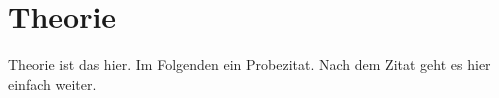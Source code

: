 \section{Theorie}
\label{sec:Theorie}
Theorie ist das hier. Im Folgenden ein Probezitat.
\cite{sample}
Nach dem Zitat geht es hier einfach weiter.
